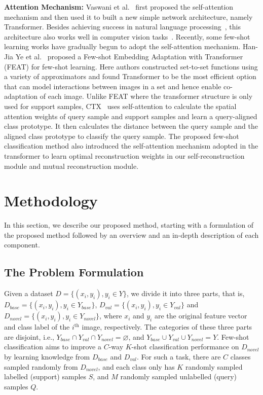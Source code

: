 \documentclass[letterpaper]{article} %
\begin{document}

\textbf{Attention Mechanism:}
Vaswani et al.~\cite{NIPS2017_3f5ee243} first proposed the self-attention mechanism and then used it to built a new simple network architecture, namely Transformer. 
Besides achieving success in natural language processing~\cite{NIPS2017_3f5ee243, Devlin2019BERTPO, brown2020language}, this architecture also works well in computer vision tasks~\cite{dosovitskiy2021an, hassani2021escaping, Chen2021CrossViTCM}.
Recently, some few-shot learning works have gradually begun to adopt the self-attention mechanism. Han-Jia Ye et al.~\cite{Ye_2020_CVPR} proposed a Few-shot Embedding Adaptation with Transformer (FEAT) for few-shot learning. Here authors constructed set-to-set functions using a variety of approximators and found Transformer to be the most efficient option that {can model interactions between images in a set and hence enable co-adaptation of each image.}
{Unlike FEAT where the transformer structure is only used for support samples, CTX~\cite{NEURIPS2020_fa28c6cd} uses self-attention to calculate the spatial attention weights of query sample and support samples and learn a query-aligned class prototype. It then calculates the distance between the query sample and the aligned class prototype to classify the query sample.}
The proposed few-shot classification method also introduced the self-attention mechanism adopted in the transformer to learn optimal reconstruction weights in our self-reconstruction module and mutual reconstruction module.



\section{Methodology}
In this section, we describe our proposed method, starting with a formulation of the proposed method followed by an overview and an in-depth description of each component.





\subsection{The Problem Formulation}
Given a dataset $D = \{(x_i,y_i), y_i \in Y\}$, we divide it into three parts, that is, $D_{base} = \{(x_i,y_i), y_i \in Y_{base}\}$, $D_{val} = \{(x_i,y_i), y_i \in Y_{val}\}$ and $D_{novel} =\{ (x_i,y_i), y_i \in Y_{novel}\}$, where $x_i$ and  $y_i$ are the original feature vector and class label of the $i^\text{th}$ image, respectively.
The categories of these three parts are disjoint, i.e., $Y_{base} \cap Y_{val} \cap Y_{novel} = \varnothing$, and $Y_{base} \cup Y_{val} \cup Y_{novel} = Y$. 
Few-shot classification aims to improve a $C$-way $K$-shot classification performance on $D_{novel}$ by learning knowledge from $D_{base}$ and $D_{val}$. 
For such a task, there are $C$ classes sampled randomly from $D_{novel}$, and each class only has $K$ {randomly sampled} labelled (support) samples $S$, and $M$ {randomly sampled} unlabelled (query) samples $Q$.
\end{document}
